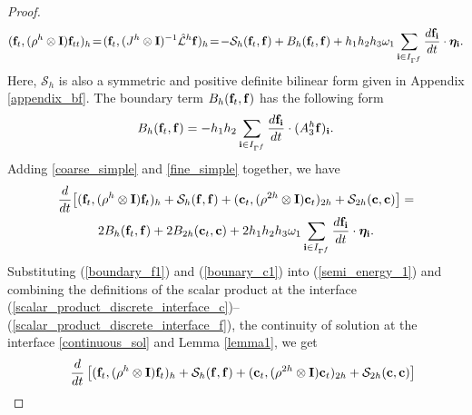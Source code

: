 \begin{proof}
	\begin{eqnarray}\label{fine_simple}
	({\bf f}_t, (\rho^{h}\otimes {\bf I}){\bf f}_{tt})_{h} \!=\! ({\bf f}_t,(J^{h}\otimes {\bf I})^{-1}\hat{\mathcal{L}}^{h}{\bf f})_{h} \!=\! -\mathcal{S}_{h}({\bf f}_t,{\bf f}) + B_{h}({\bf f}_t,{{\bf f}}) + h_1h_2h_3\omega_1\sum_{{\bf i}\in I_{\Gamma^f}} \frac{d{\bf f}_{\bf i}}{dt}\cdot{\bm \eta}_{\bf i}.
	\end{eqnarray}
Here, $\mathcal{S}_h$ is also a symmetric and positive definite bilinear form given in Appendix \ref{appendix_bf}. The boundary term $B_h ({\bf f}_t,{\bf f})$ has the following form
	\begin{equation}\label{boundary_f1}
	B_h ({\bf f}_t,{\bf f}) = -h_1h_2\sum_{{\bf i}\in I_{\Gamma^f}}\frac{d{\bf f}_{\bf i}}{dt}\cdot(A_3^h {\bf f})_{\bf i}.
	\end{equation}
	 Adding \eqref{coarse_simple} and \eqref{fine_simple} together, we have
	\begin{multline}\label{semi_energy_1}
	\frac{d}{dt}\big[({\bf f}_t,(\rho^h\otimes {\bf I}) {\bf f}_t)_h + \mathcal{S}_{h}({\bf f},{\bf f}) + ({\bf c}_t,(\rho^{2h}\otimes {\bf I}) {\bf c}_t)_{2h} + \mathcal{S}_{2h}({\bf c},{\bf c}) \big]  = \\
	2B_{h}({\bf f}_t,{\bf f}) + 2B_{2h}({\bf c}_t,{\bf c}) +2h_1h_2h_3\omega_1\sum_{{\bf i}\in I_{\Gamma^f}} \frac{d{\bf f}_{\bf i}}{dt}\cdot{\bm \eta}_{\bf i}.
	\end{multline}
	Substituting (\ref{boundary_f1}) and (\ref{bounary_c1}) into (\ref{semi_energy_1}) and combining the definitions of the scalar product at the interface (\ref{scalar_product_discrete_interface_c})--(\ref{scalar_product_discrete_interface_f}), the continuity of solution at the interface \eqref{continuous_sol} and Lemma \ref{lemma1}, we get
	\begin{align*}%
	&\hspace{0.4cm}\frac{d}{dt}\left[({\bf f}_t,(\rho^h\otimes {\bf I}) {\bf f}_t)_{h} + \mathcal{S}_{h}({\bf f},{\bf f}) + ({\bf c}_t,(\rho^{2h}\otimes {\bf I}) {\bf c}_t)_{2h} + \mathcal{S}_{2h}({\bf c},{\bf c}) \right]   \\%

\end{align*}
\end{proof}
